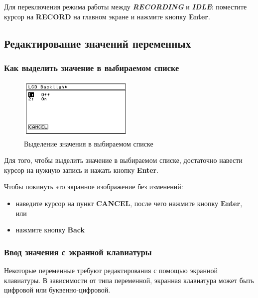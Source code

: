 Для переключения режима работы между \textit{\textbf{RECORDING}} и
\textit{\textbf{IDLE}}: поместите курсор на \textbf{RECORD} на главном экране и
нажмите кнопку \textbf{Enter}.

\subsection{Редактирование значений переменных}

\subsubsection{Как выделить значение в выбираемом списке}

\begin{figure}[h]
  \centering
  \includegraphics[width=0.49\textwidth]{figures/choosing_a_value_from_a_selectable_list}
  \caption{Выделение значения в выбираемом списке}
  \label{fig:choosing_a_value_from_a_selectable_list}
\end{figure}

Для того, чтобы выделить значение в выбираемом списке, достаточно навести курсор
на нужную запись и нажать кнопку \textbf{Enter}.

Чтобы покинуть это экранное изображение без изменений:
\begin{itemize}
  \item наведите курсор на пункт \textbf{CANCEL}, после чего нажмите кнопку
    \textbf{Enter}, или
  \item нажмите кнопку \textbf{Back}
\end{itemize}

\subsubsection{Ввод значения с экранной клавиатуры}
\label{subsubsec:entering_a_value_with_onscreen_keypad}

Некоторые переменные требуют редактирования с помощью экранной клавиатуры.  В
зависимости от типа переменной, экранная клавиатура может быть цифровой или
буквенно-цифровой.

